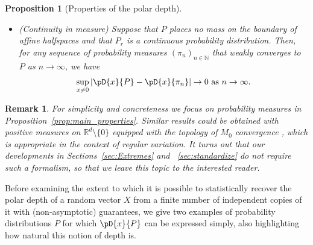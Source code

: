 \documentclass{article}
\numberwithin{equation}{section}
\newtheorem{proposition}{Proposition}[section]
\newtheorem{remark}{Remark}[section]
\newcommand{\rset}{\mathbb{R}}
\newcommand{\coD}[2]{\pD{#1}{#2}}
\newcommand{\PropContinuityAsFuncMeasureCODText}{$\textbf{D}_6$}  %
\begin{document}
\begin{proposition}[Properties of the polar depth]
\begin{itemize}
            \(P_r\) is continuous,
            then \(\coD{x}{P}\) is a continuous function of \(x\).
        \item[\PropContinuityAsFuncMeasureCODText]\label{prop:ContinuityAsFuncMeasureCOD}
            {\sc (Continuity in measure)} Suppose that $P$ places no mass on the boundary of affine halfspaces and that $P_r$ is a continuous probability distribution. Then, for any sequence of
           probability 
           measures \((\pi_n)_{n\in \mathbb{N}}\) that weakly converges to \(P\) as $n\to \infty$, %
     we have
            \begin{equation}
                \sup_{x\neq 0  } |\coD{x}{P} -
                \coD{x}{\pi_n}|\to 0 \text{ as } n\to \infty.
            \end{equation}
    \end{itemize}
\end{proposition}

\begin{remark}
    \label{rem:regularity_measures}
    For simplicity and concreteness we focus on probability measures in Proposition~\ref{prop:main_properties}. Similar results could be obtained with positive measures on $\rset^d\setminus\{0\}$ equipped with the topology of $M_0$ convergence \citep{hult2006regular}, which is appropriate in the context of regular variation. It turns out that our developments in Sections~\ref{sec:Extremes} and ~\ref{sec:standardize} do not require such a formalism, so that we leave this topic to the interested reader. 
\end{remark}


Before examining the extent to which it is possible to statistically recover the polar depth of a random vector $X$ from a finite number of independent copies of it with (non-asymptotic) guarantees, we give two examples of probability distributions $P$ for which $\coD{x}{P}$ can be expressed simply, also highlighting how natural this notion of depth is.
\end{document}
